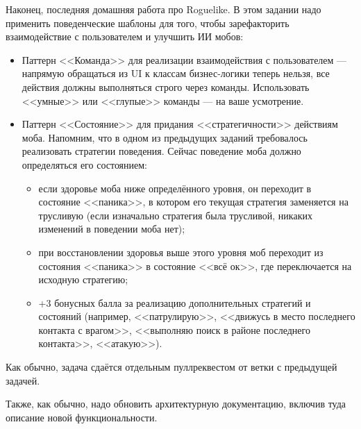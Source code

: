 \documentclass[a5paper]{homework}
\begin{document}

Наконец, последняя домашняя работа про Roguelike. В этом задании надо применить поведенческие шаблоны для того, чтобы зарефакторить взаимодействие с пользователем и улучшить ИИ мобов:

\begin{itemize}
    \item Паттерн <<Команда>> для реализации взаимодействия с пользователем --- напрямую обращаться из UI к классам бизнес-логики теперь нельзя, все действия должны выполняться строго через команды. Использовать <<умные>> или <<глупые>> команды --- на ваше усмотрение.
    \item Паттерн <<Состояние>> для придания <<стратегичности>> действиям моба. Напомним, что в одном из предыдущих заданий требовалось реализовать стратегии поведения. Сейчас поведение моба должно определяться его состоянием:
    \begin{itemize}
        \item если здоровье моба ниже определённого уровня, он переходит в состояние <<паника>>, в котором его текущая стратегия заменяется на трусливую (если изначально стратегия была трусливой, никаких изменений в поведении моба нет);
        \item при восстановлении здоровья выше этого уровня моб переходит из состояния <<паника>> в состояние <<всё ок>>, где переключается на исходную стратегию;
        \item +3 бонусных балла за реализацию дополнительных стратегий и состояний (например, <<патрулирую>>, <<движусь в место последнего контакта с врагом>>, <<выполняю поиск в районе последнего контакта>>, <<атакую>>).
    \end{itemize}
\end{itemize}

Как обычно, задача сдаётся отдельным пуллреквестом от ветки с предыдущей задачей.

Также, как обычно, надо обновить архитектурную документацию, включив туда описание новой функциональности.
\end{document}
